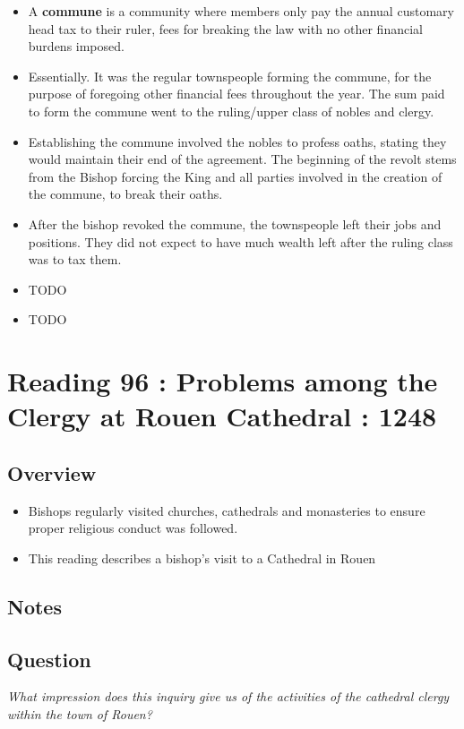 \documentclass[12pt]{article}
\begin{document}
\begin{itemize}
	\item A \textbf{commune} is a community where members only pay the annual customary head tax to their ruler, fees for breaking the law with no other financial burdens imposed.
	\item Essentially. It was the regular townspeople forming the commune, for the purpose of foregoing other financial fees throughout the year. The sum paid to form the commune went to the ruling/upper class of nobles and clergy.
	\item Establishing the commune involved the nobles to profess oaths, stating they would maintain their end of the agreement. The beginning of the revolt stems from the Bishop forcing the King and all parties involved in the creation of the commune, to break their oaths.
	\item After the bishop revoked the commune, the townspeople left their jobs and positions. They did not expect to have much wealth left after the ruling class was to tax them.
	\item TODO
	\item TODO
\end{itemize}


\section*{Reading 96 : Problems among the Clergy at Rouen Cathedral : 1248}

\subsection*{Overview}
\begin{itemize}
	\item Bishops regularly visited churches, cathedrals and monasteries to ensure proper religious conduct was followed.
	\item This reading describes a bishop's visit to a Cathedral in Rouen
\end{itemize}


\subsection*{Notes}

\subsection*{Question}

\textit{What impression does this inquiry give us of the activities of the cathedral clergy within the town of Rouen?}
\end{document}
